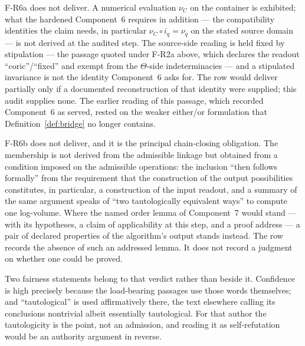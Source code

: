 \documentclass[11pt,a4paper]{article}
\begin{document}
F-R6a does not deliver. A numerical evaluation $\nu_C$ on the container is
exhibited; what the hardened Component~6 requires in addition --- the
compatibility identities the claim needs, in particular $\nu_C \circ i_q = \nu_q$ on the
stated source domain --- is not derived at the audited step. The
source-side reading is held fixed by stipulation --- the passage quoted under
F-R2a above, which declares the readout ``coric''/``fixed'' and exempt from the
$\Theta$-side indeterminacies --- and a stipulated invariance is
not the identity Component~6 asks for. The row would deliver partially only if a
documented reconstruction of that identity were supplied; this audit supplies
none. The earlier reading of this passage, which recorded Component~6 as served,
rested on the weaker either/or formulation that Definition~\ref{def:bridge} no
longer contains.

F-R6b does not deliver, and it is the principal chain-closing obligation. The
membership is not derived from the admissible linkage but
obtained from a condition imposed on the admissible operations: the inclusion
``then follows formally'' from the requirement that the construction of the
output possibilities constitutes, in particular, a construction of the input
readout, and a summary of the same argument speaks of ``two tautologically
equivalent ways'' to compute one log-volume. Where the named order lemma of
Component~7 would stand --- with its hypotheses, a claim of applicability at
this step, and a proof address --- a pair of declared properties of the
algorithm's output stands instead. The row records the absence of such an
addressed lemma. It does not record a judgment on whether one could be proved.

Two fairness statements belong to that verdict rather than beside it. Confidence
is high precisely because the load-bearing passages use those words themselves;
and ``tautological'' is used affirmatively there, the text elsewhere calling its
conclusions nontrivial albeit essentially tautological. For that author the
tautologicity is the point, not an admission, and reading it as self-refutation
would be an authority argument in reverse.
\end{document}
